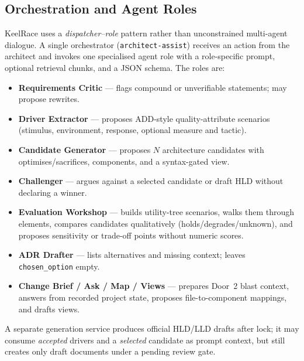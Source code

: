 \documentclass[conference]{IEEEtran}
\begin{document}
\subsection{Orchestration and Agent Roles}
KeelRace uses a \emph{dispatcher--role} pattern rather than unconstrained multi-agent dialogue.
A single orchestrator (\texttt{architect-assist}) receives an action from the architect and invokes one specialised agent role with a role-specific prompt, optional retrieval chunks, and a JSON schema.
The roles are:
\begin{itemize}
\item \textbf{Requirements Critic} --- flags compound or unverifiable statements; may propose rewrites.
\item \textbf{Driver Extractor} --- proposes ADD-style quality-attribute scenarios (stimulus, environment, response, optional measure and tactic).
\item \textbf{Candidate Generator} --- proposes $N$ architecture candidates with optimises/sacrifices, components, and a syntax-gated view.
\item \textbf{Challenger} --- argues against a selected candidate or draft HLD without declaring a winner.
\item \textbf{Evaluation Workshop} --- builds utility-tree scenarios, walks them through elements, compares candidates qualitatively (holds/degrades/unknown), and proposes sensitivity or trade-off points without numeric scores.
\item \textbf{ADR Drafter} --- lists alternatives and missing context; leaves \texttt{chosen\_option} empty.
\item \textbf{Change Brief / Ask / Map / Views} --- prepares Door~2 blast context, answers from recorded project state, proposes file-to-component mappings, and drafts views.
\end{itemize}
A separate generation service produces official HLD/LLD drafts after lock; it may consume \emph{accepted} drivers and a \emph{selected} candidate as prompt context, but still creates only draft documents under a pending review gate.
\end{document}

